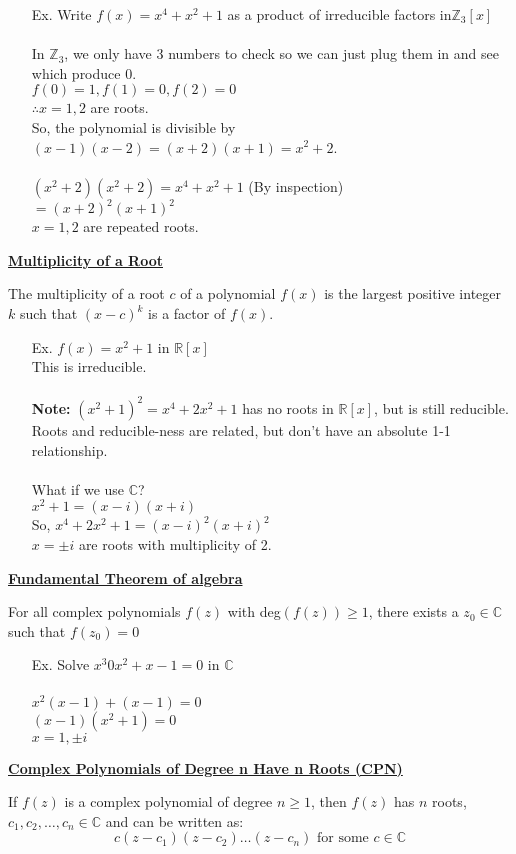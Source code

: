 \documentclass{letter}
\begin{document}
	\begin{itemize}
		\item[Ex. ] Write $f(x) = x^4 + x^2 + 1$ as a product of irreducible factors in$\mathbb{Z}_3 \left[ x \right]$\\\\
		
		In $\mathbb{Z}_3$, we only have 3 numbers to check so we can just plug them in and see which produce 0.\\
		$f(0) = 1, f(1) = 0, f(2) = 0$\\
		$\therefore x=1, 2$ are roots.\\
		So, the polynomial is divisible by $(x-1)(x-2) = (x+2)(x+1) = x^2 + 2$.\\\\
		$(x^2 + 2)(x^2 + 2) = x^4 + x^2 + 1$ (By inspection)\\
		$= (x+2)^2 (x+1)^2$\\
		$x = 1, 2$ are repeated roots.
	\end{itemize}
	
	\underline{\textbf{Multiplicity of a Root}}
	
	The multiplicity of a root $c$ of a polynomial $f(x)$ is the largest positive integer $k$ such that $(x-c)^k$ is a factor of $f(x)$.
	
	\begin{itemize}
		\item[Ex. ] $f(x) = x^2 + 1$ \;\;\;\;\; in $\mathbb{R}\left[ x \right]$\\
		This is irreducible.\\\\
		\textbf{Note: } $(x^2 + 1)^2 = x^4 + 2x^2 + 1$ has no roots in $\mathbb{R} \left[ x \right]$, but is still reducible. Roots and reducible-ness are related, but don't have an absolute 1-1 relationship.\\\\
		What if we use $\mathbb{C}$?\\
		$x^2+1 = (x-i)(x+i)$\\
		So, $x^4 + 2x^2 + 1 = (x-i)^2 (x+i)^2$\\
		$x = \pm i$ are roots with multiplicity of 2.
	\end{itemize}
	
	\underline{\textbf{Fundamental Theorem of algebra}}
	
	For all complex polynomials $f(z)$ with deg$(f(z)) \geq 1$, there exists a $z_0 \in \mathbb{C}$ such that $f(z_0) = 0$
	
	\begin{itemize}
		\item[Ex. ] Solve $x^3 0 x^2 + x - 1 = 0$ in $\mathbb{C}$\\\\
		$x^2(x-1) + (x-1) = 0$\\
		$(x-1)(x^2 + 1) = 0$\\
		$x=1, \pm i$
	\end{itemize}
	
	\underline{\textbf{Complex Polynomials of Degree n Have n Roots (CPN)}}
	
	If $f(z)$ is a complex polynomial of degree $n \geq 1$, then $f(z)$ has $n$ roots, $c_1, c_2, \dots, c_n \in \mathbb{C}$ and can be written as:
	\[ c(z-c_1)(z-c_2)\dots (z-c_n) \text{ for some } c \in \mathbb{C} \]
\end{document}
